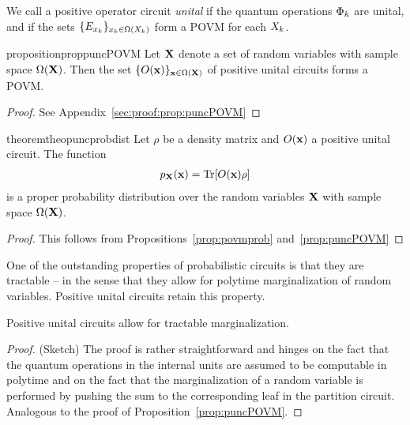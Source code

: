 \begin{definition}
	We call a positive operator circuit \textit{unital} if the quantum operations $\Phi_k$ are unital, and if the sets $\{ E_{x_k} \}_{x_k \in \Omega(X_k)}$ form a POVM for each $X_k$.
\end{definition}


\begin{restatable}{proposition}{proppuncPOVM}
	\label{prop:puncPOVM}
	Let $\mathbf{X}$ denote a set of random variables with sample space $\Omega(\mathbf{X})$.
	Then the set $\{ O(\mathbf{x})\}_{\mathbf{x} \in \Omega(\mathbf{X})}$ of positive unital circuits forms a POVM.
\end{restatable}

\begin{proof}
	See Appendix~\ref{sec:proof:prop:puncPOVM}
\end{proof}




\begin{restatable}{theorem}{theopuncprobdist}
	\label{theo:puncprobdist}
	Let $\rho$ be a density matrix and $O(\mathbf{x})$ a positive unital circuit. The function
	\begin{align}
		p_{\mathbf{X}}(\mathbf{x}) = \Tr [O(\mathbf{x}) \rho]
		\label{eq:theo:prob_operator}
	\end{align}
	is a proper probability distribution over the random variables $\mathbf{X}$ with sample space $\Omega(\mathbf{X})$.
\end{restatable}

\begin{proof}
	This follows from Propositions~\ref{prop:povmprob} and~\ref{prop:puncPOVM}
\end{proof}

One of the outstanding properties of probabilistic circuits is that they are tractable -- in the sense that they allow for polytime marginalization of random variables. Positive unital circuits retain this property.

\begin{proposition}
	\label{prop:efficientmarg_sdpunc}
	Positive unital circuits allow for tractable marginalization.
\end{proposition}

\begin{proof}
	(Sketch) The proof is rather straightforward and hinges on the fact that the quantum operations in the internal units are assumed to be computable in polytime and on the fact that the marginalization of a random variable is performed by pushing the sum to the corresponding leaf in the partition circuit. Analogous to the proof of Proposition~\ref{prop:puncPOVM}.
\end{proof}






